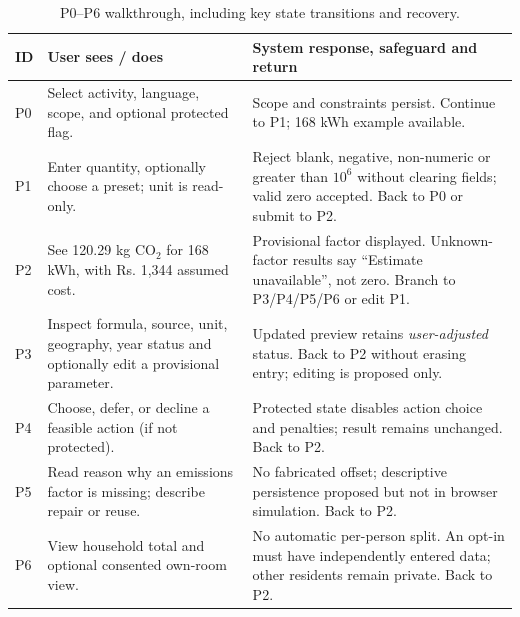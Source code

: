 \documentclass[12pt,a4paper]{article}
\begin{document}
\begin{table}[H]
\centering\footnotesize
\caption{P0--P6 walkthrough, including key state transitions and recovery.}
\label{tab:walkthrough}
\begin{tabularx}{\textwidth}{|p{0.8cm}|p{4.1cm}|X|}
\toprule
\textbf{ID}&\textbf{User sees / does}&\textbf{System response, safeguard and return}\\
\midrule
P0&Select activity, language, scope, and optional protected flag.&Scope and constraints persist. Continue to P1; 168 kWh example available.\\
P1&Enter quantity, optionally choose a preset; unit is read-only.&Reject blank, negative, non-numeric or greater than $10^6$ without clearing fields; valid zero accepted. Back to P0 or submit to P2.\\
P2&See 120.29 kg CO$_2$ for 168 kWh, with Rs. 1,344 assumed cost.&Provisional factor displayed. Unknown-factor results say ``Estimate unavailable'', not zero. Branch to P3/P4/P5/P6 or edit P1.\\
P3&Inspect formula, source, unit, geography, year status and optionally edit a provisional parameter.&Updated preview retains \emph{user-adjusted} status. Back to P2 without erasing entry; editing is proposed only.\\
P4&Choose, defer, or decline a feasible action (if not protected).&Protected state disables action choice and penalties; result remains unchanged. Back to P2.\\
P5&Read reason why an emissions factor is missing; describe repair or reuse.&No fabricated offset; descriptive persistence proposed but not in browser simulation. Back to P2.\\
P6&View household total and optional consented own-room view.&No automatic per-person split. An opt-in must have independently entered data; other residents remain private. Back to P2.\\
\bottomrule
\end{tabularx}
\end{table}
\end{document}
